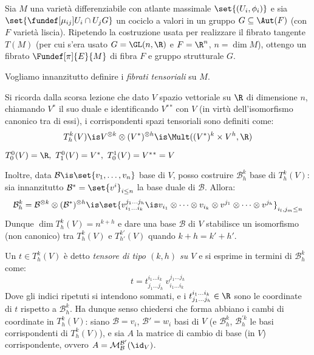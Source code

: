 

\newcommand*\Ps{\mathbb{P}} %
\newcommand*\tc{\ \text{t.c.} \ } %
\newcommand*\dual{{^\ast}} %
\newcommand*\base[1][B]{\mathcal{#1}} %


Sia $M$ una varietà differenziabile con atlante massimale $\set{(U_i, \phi_i)}$
e sia $\set{ \fundef[\mu_{ij}]{U_i \cap U_j}{G} }$ un cociclo a valori in un gruppo $G \subseteq \Aut(F)$ (con $F$ varietà liscia). Ripetendo la costruzione usata per realizzare il fibrato tangente $T(M)$ (per cui s'era usato $G = \GL(n, \R)$ e $F=\R^n$, $n = \dim M$), ottengo un fibrato $\Fundef[\pi]{E}{M}$ di fibra $F$ e gruppo strutturale $G$.


Vogliamo innanzitutto definire i \emph{fibrati tensoriali} su $M$.

Si ricorda dalla scorsa lezione che dato $V$ spazio vettoriale su $\R$ di dimensione $n$, chiamando $V\dual$ il suo duale e identificando $V \dual \dual$ con $V$ (in virtù dell'isomorfismo canonico tra di essi), i corrispondenti spazi tensoriali sono definiti come: \[
T_h^k(V) \is V^{\otimes k} \otimes (V \dual)^{\otimes h} \is \Mult( (V\dual)^k \times V^h, \R)  \]
\begin{oss}
	$ T_0^0(V) = \R, \ T_1^0(V) = V \dual, \ T_0^1(V) = V \dual \dual = V $
\end{oss}	
Inoltre, data $\base \is \set{v_1, \dots, v_n}$ base di $V$, posso costruire $\base_h^k$ base di $T_h^k(V)$: sia innanzitutto $\base \dual = \set{v^i}_{i \leq n}$ la base duale di $\base$. Allora: \[
\base_h^k = \base ^{\otimes k} \otimes (\base \dual)^{\otimes h} \is
\set{v^{j_1 \dots j_h}_{i_1 \dots i_k} \is v_{i_1} \otimes \dots \otimes v_{i_k} \otimes v^{j_1} \otimes \dots \otimes v^{j_h} } _{i_l, j_m \leq n} \]
Dunque $\dim T_h^k(V) = n^{k+h}$ e dare una base $\base$ di $V$ stabilisce un isomorfismo (non canonico) tra $T_h^k(V)$ e $T_{h'}^{k'}(V)$ quando $k+h = k'+h'$.

Un $t \in T_h^k(V)$ è detto \emph{tensore di tipo $(k, h)$ su $V$} e si esprime in termini di $\base_h^k$ come: \[
t = t_{j_1 \dots j_h}^{i_1 \dots i_k} \  v^{j_1 \dots j_h}_{i_1 \dots i_k} \]
Dove gli indici ripetuti si intendono sommati, e i $t_{j_1 \dots j_h}^{i_1 \dots i_k} \in \R$ sono le coordinate di $t$ rispetto a $\base_h^k$. Ha dunque senso chiedersi che forma abbiano i cambi di coordinate in $T^k_h(V)$: siano $\base={v_i}$, $\base'={w_i}$ basi di $V$ (e $\base_h^k$, $\base_h^{\prime k}$ le basi corrispondenti di $T^k_h(V)$), e sia $A$ la matrice di cambio di base (in $V$) corrispondente, ovvero $A = \mathcal{M}_{\base}^{\base'}(\id_V)$.

